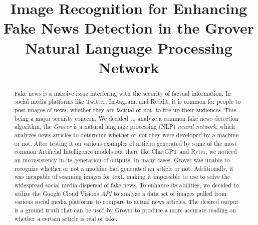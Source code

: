 \documentclass[conference]{IEEEtran}
\begin{document}
\title{Image Recognition for Enhancing Fake News Detection in the Grover Natural Language Processing Network\\
}

\author{
\and
{}
\and
{}
\and
{}
\and
{}
}
\maketitle

\begin{abstract}
Fake news is a massive issue interfering with the security of factual information. In social media platforms like Twitter, Instagram, and Reddit, it is common for people to post images of news, whether they are factual or not, to fire up their audiences. This being a major security concern, We decided to analyze a common fake news detection algorithm, the \emph{Grover} is a natural language processing (NLP) \emph{neural network}, which analyzes news articles to determine whether or not they were developed by a machine or not. After testing it on various examples of articles generated by some of the most common Artificial Intelligence models out there like ChatGPT and Ryter, we noticed an inconsistency in its generation of outputs. In many cases, Grover was unable to recognize whether or not a machine had generated an article or not. Additionally, it was incapable of scanning images for text, making it impossible to use to solve the widespread social media dispersal of fake news. To enhance its abilities, we decided to utilize the Google Cloud Visions \emph{API} to analyze a data set of images pulled from various social media platforms to compare to actual news articles. The desired output is a ground truth that can be used by Grover to produce a more accurate reading on whether a certain article is real or fake. 
\end{abstract}
\end{document}
